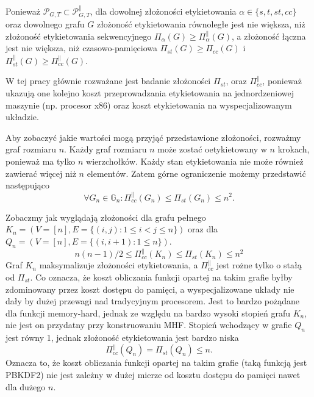 Ponieważ $ \mathcal{P}_{G,T} \subset  \mathcal{P}_{G,T}^{ \parallel } $, dla dowolnej złożoności etykietowania $ \alpha \in \{s, t, st, cc \}$ oraz dowolnego grafu $G$ złożoność etykietowania równoległe jest nie większa, niż złożoność etykietowania sekwencyjnego $ \Pi_{ \alpha }(G) \geq \Pi_{ \alpha}^{\parallel}(G)$, a złożoność łączna jest nie większa, niż czasowo-pamięciowa  $ \Pi_{ st }(G) \geq \Pi_{ cc }(G)$ i $ \Pi_{ st }^{ \parallel }(G) \geq \Pi_{ cc }^{ \parallel }(G)$.

W tej pracy głównie rozważane jest badanie złożoności $\Pi_{ st }$, oraz $\Pi_{ cc }^{ \parallel }$, ponieważ ukazują one kolejno koszt przeprowadzania etykietowania na jednordzeniowej maszynie (np. procesor x86) oraz koszt etykietowania na wyspecjalizowanym układzie.

Aby zobaczyć jakie wartości mogą przyjąć przedstawione złożoności, rozważmy graf rozmiaru $n$.
Każdy graf rozmiaru $n$ może zostać oetykietowany w $n$ krokach, ponieważ ma tylko $n$ wierzchołków. Każdy stan etykietowania nie może również zawierać więcej niż $n$ elementów. Zatem górne ograniczenie możemy przedstawić następująco
$$ \forall G_{n} \in \mathbb{G}_{n} : \Pi_{ cc }^{ \parallel }(G_{n}) \leq \Pi_{ st }(G_{n}) \leq n^{2} . $$

Zobaczmy jak wyglądają złożoności dla grafu pełnego $K_{n} = (V = [n], E= \{
(i,j): 1 \leq i < j \leq n \})$ oraz dla $Q_{n} = (V = [n], E = \{ (i, i+1) : 1 \leq n \} )$.
$$ n(n - 1) / 2 \leq \Pi_{ cc }^{ \parallel }(K_{n}) \leq \Pi_{ st }(K_{n}) \leq n^2$$
Graf $K_{n}$ maksymalizuje złożoności etykietowania, a  $\Pi_{ cc }^{ \parallel }$ jest rożne tylko o stałą od $\Pi_{ st }$. Co oznacza, że koszt obliczania funkcji opartej na takim grafie byłby zdominowany przez koszt dostępu do pamięci, a wyspecjalizowane układy nie dały by dużej przewagi nad tradycyjnym procesorem. Jest to bardzo pożądane dla funkcji memory-hard, jednak ze względu na bardzo wysoki stopień grafu $K_{n}$, nie jest on przydatny przy konstruowaniu MHF.
Stopień wchodzący w grafie $Q_{n}$ jest równy 1, jednak złożoność etykietowania jest bardzo niska
$$ \Pi_{ cc }^{ \parallel }(Q_{n}) = \Pi_{ st }(Q_{n}) \leq n. $$ 
Oznacza to, że koszt obliczania funkcji opartej na takim grafie (taką funkcją jest PBKDF2) nie jest zależny w dużej mierze od kosztu dostępu do pamięci nawet dla dużego $n$. 



